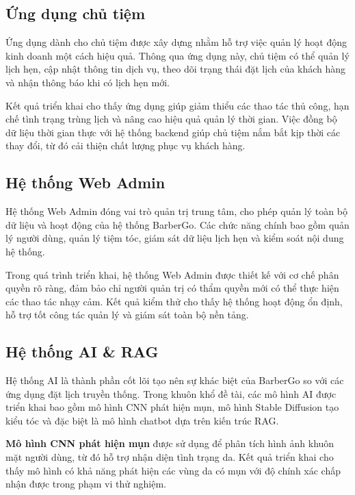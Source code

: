 \subsection{Ứng dụng chủ tiệm}

Ứng dụng dành cho chủ tiệm được xây dựng nhằm hỗ trợ việc quản lý hoạt động kinh doanh một cách hiệu quả. Thông qua ứng dụng này, chủ tiệm có thể quản lý lịch hẹn, cập nhật thông tin dịch vụ, theo dõi trạng thái đặt lịch của khách hàng và nhận thông báo khi có lịch hẹn mới.

Kết quả triển khai cho thấy ứng dụng giúp giảm thiểu các thao tác thủ công, hạn chế tình trạng trùng lịch và nâng cao hiệu quả quản lý thời gian. Việc đồng bộ dữ liệu thời gian thực với hệ thống backend giúp chủ tiệm nắm bắt kịp thời các thay đổi, từ đó cải thiện chất lượng phục vụ khách hàng.

\subsection{Hệ thống Web Admin}

Hệ thống Web Admin đóng vai trò quản trị trung tâm, cho phép quản lý toàn bộ dữ liệu và hoạt động của hệ thống BarberGo. Các chức năng chính bao gồm quản lý người dùng, quản lý tiệm tóc, giám sát dữ liệu lịch hẹn và kiểm soát nội dung hệ thống.

Trong quá trình triển khai, hệ thống Web Admin được thiết kế với cơ chế phân quyền rõ ràng, đảm bảo chỉ người quản trị có thẩm quyền mới có thể thực hiện các thao tác nhạy cảm. Kết quả kiểm thử cho thấy hệ thống hoạt động ổn định, hỗ trợ tốt công tác quản lý và giám sát toàn bộ nền tảng.

\subsection{Hệ thống AI \& RAG}

Hệ thống AI là thành phần cốt lõi tạo nên sự khác biệt của BarberGo so với các ứng dụng đặt lịch truyền thống. Trong khuôn khổ đề tài, các mô hình AI được triển khai bao gồm mô hình CNN phát hiện mụn, mô hình Stable Diffusion tạo kiểu tóc và đặc biệt là mô hình chatbot dựa trên kiến trúc RAG.

\textbf{Mô hình CNN phát hiện mụn} được sử dụng để phân tích hình ảnh khuôn mặt người dùng, từ đó hỗ trợ nhận diện tình trạng da. Kết quả triển khai cho thấy mô hình có khả năng phát hiện các vùng da có mụn với độ chính xác chấp nhận được trong phạm vi thử nghiệm.

